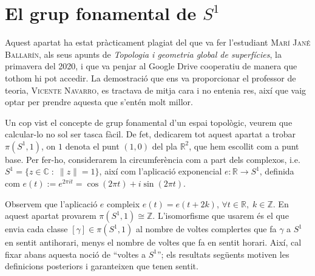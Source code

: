 \documentclass[../main.tex]{subfiles}
\begin{document}
\section{El grup fonamental de \texorpdfstring{$S^1$}{TEXT}}

Aquest apartat ha estat pràcticament plagiat del que va fer l'estudiant \textsc{Marí Jané Ballarín}, als seus apunts de \textit{Topologia i geometria global de superfícies}, la primavera del 2020, i que va penjar al Google Drive cooperatiu de manera que tothom hi pot accedir. La demostració que ens va proporcionar el professor de teoria, \textsc{Vicente Navarro}, es tractava de mitja cara i no entenia res, així que vaig optar per prendre aquesta que s'entén molt millor.

Un cop vist el concepte de grup fonamental d'un espai topològic, veurem que calcular-lo no sol ser tasca fàcil. De fet, dedicarem tot aquest apartat a trobar $\pi(S^1,1)$, on $1$ denota el punt $(1,0)$ del pla $\mathbb{R}^2$, que hem escollit com a punt base. Per fer-ho, considerarem la circumferència com a part dels complexos, i.e. $S^1=\{z\in\mathbb{C}\;:\;\|z\|=1\}$, així com l'aplicació exponencial $e:\mathbb{R}\rightarrow S^1$, definida com $e(t):=e^{2\pi it} = \cos(2\pi t)+i\sin(2\pi t)$.

Observem que l'aplicació $e$ compleix $e(t) = e(t+2k)$, $\forall t\in \mathbb{R},\;k\in\mathbb{Z}$. En aquest apartat provarem $\pi(S^1,1)\cong \mathbb{Z}$. L'isomorfisme que usarem és el que envia cada classe $[\gamma]\in\pi(S^1,1)$ al nombre de voltes complertes que fa $\gamma$ a $S^1$ en sentit antihorari, menys el nombre de voltes que fa en sentit horari. Així, cal fixar abans aquesta noció de ``voltes a $S^1$''; els resultats següents motiven les definicions posteriors i garanteixen que tenen sentit.
\end{document}
